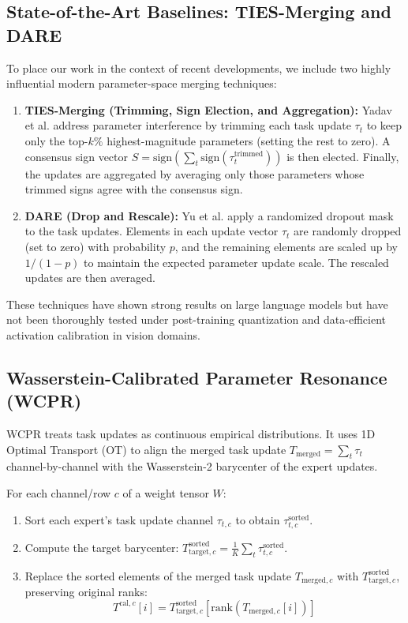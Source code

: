 \documentclass{article}
\theoremstyle{plain}
\theoremstyle{definition}
\theoremstyle{remark}
\begin{document}
\subsection{State-of-the-Art Baselines: TIES-Merging and DARE}
To place our work in the context of recent developments, we include two highly influential modern parameter-space merging techniques:
\begin{enumerate}
    \item \textbf{TIES-Merging (Trimming, Sign Election, and Aggregation):} Yadav et al. \cite{yadav2023ties} address parameter interference by trimming each task update $\tau_t$ to keep only the top-$k\%$ highest-magnitude parameters (setting the rest to zero). A consensus sign vector $S = \text{sign}(\sum_t \text{sign}(\tau^{\text{trimmed}}_t))$ is then elected. Finally, the updates are aggregated by averaging only those parameters whose trimmed signs agree with the consensus sign.
    \item \textbf{DARE (Drop and Rescale):} Yu et al. \cite{yu2023language} apply a randomized dropout mask to the task updates. Elements in each update vector $\tau_t$ are randomly dropped (set to zero) with probability $p$, and the remaining elements are scaled up by $1/(1-p)$ to maintain the expected parameter update scale. The rescaled updates are then averaged.
\end{enumerate}
These techniques have shown strong results on large language models but have not been thoroughly tested under post-training quantization and data-efficient activation calibration in vision domains.

\subsection{Wasserstein-Calibrated Parameter Resonance (WCPR)}
WCPR \cite{theorist2026} treats task updates as continuous empirical distributions. It uses 1D Optimal Transport (OT) to align the merged task update $T_{\text{merged}} = \sum_t \tau_t$ channel-by-channel with the Wasserstein-2 barycenter of the expert updates. 

For each channel/row $c$ of a weight tensor $W$:
\begin{enumerate}
    \item Sort each expert's task update channel $\tau_{t, c}$ to obtain $\tau^{\text{sorted}}_{t, c}$.
    \item Compute the target barycenter: $T^{\text{sorted}}_{\text{target}, c} = \frac{1}{K} \sum_t \tau^{\text{sorted}}_{t, c}$.
    \item Replace the sorted elements of the merged task update $T_{\text{merged}, c}$ with $T^{\text{sorted}}_{\text{target}, c}$, preserving original ranks:
    \begin{equation}
        T^{\text{cal}, c}[i] = T^{\text{sorted}}_{\text{target}, c}[\text{rank}(T_{\text{merged}, c}[i])]
    \end{equation}
\end{enumerate}
\end{document}
